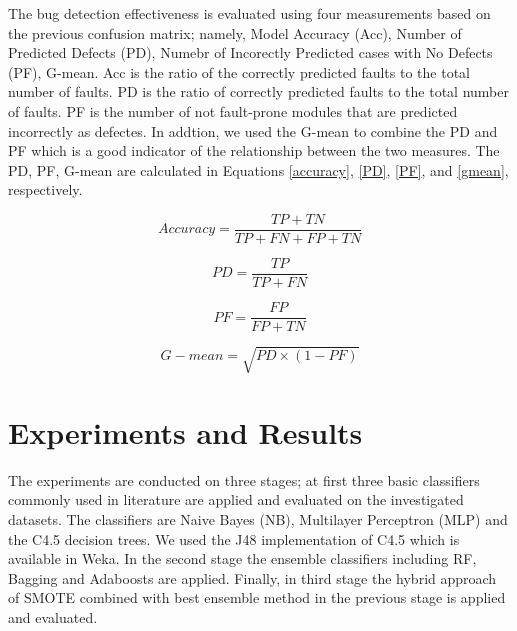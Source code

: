 \documentclass[runningheads,a4paper]{llncs}
\begin{document}
The bug detection effectiveness is evaluated using four measurements based on the previous confusion matrix; namely, Model Accuracy (Acc), Number of Predicted Defects (PD), Numebr of Incorectly Predicted cases with No Defects (PF), G-mean. Acc is the ratio of the correctly predicted faults to the total number of faults. PD is
the ratio of correctly predicted faults to the total number of faults. PF is the number of not fault-prone modules that are predicted incorrectly as defectes. In addtion, we used the G-mean to combine the PD and PF which is a good indicator of the relationship between the two measures. The PD, PF, G-mean are calculated in Equations \ref{accuracy}, \ref{PD}, \ref{PF}, and \ref{gmean}, respectively.

\begin{small}
\begin{equation}
Accuracy=\frac{TP+TN}{TP + FN + FP + TN}
\label{accuracy}
\end{equation}


\begin{equation}
PD=\frac{TP}{TP+FN}
\label{PD}
\end{equation}

\begin{equation}
PF=\frac{FP}{FP+TN}
\label{PF}
\end{equation}

\begin{equation}
G-mean=\sqrt{PD \times (1-PF)}
\label{gmean}
\end{equation}
\end{small}



\section{Experiments and Results}
\label{experiments}

The experiments are conducted on three stages; at first three basic classifiers commonly used in literature are applied and evaluated on the investigated datasets. The classifiers are Naive Bayes (NB), Multilayer Perceptron (MLP) and the C4.5 decision trees. We used the J48 implementation of C4.5 which is available in Weka. In the second stage the ensemble classifiers including RF, Bagging and Adaboosts are applied. Finally, in third stage the hybrid approach of SMOTE combined with best ensemble method in the previous stage is applied and evaluated.
\end{document}
